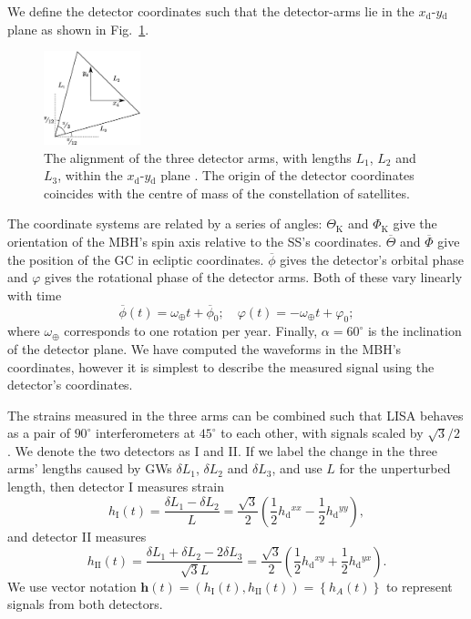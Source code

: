 \documentclass[useAMS,usedcolumn,usegraphicx,usenatbib]{mn2e}
\newcommand{\figref}[1]{Fig.~\ref{fig:#1}}
\newcommand{\sub}[1]{\ensuremath{_\mathrm{#1}}}
\newcommand{\recip}[1]{\ensuremath{\frac{1}{#1}}}
\begin{document}
We define the detector coordinates such that the detector-arms lie in the $x\sub{d}$-$y\sub{d}$ plane as shown in \figref{LISA_arms}.
\begin{figure}
\begin{center}
 \includegraphics[width=0.25\textwidth]{LISA_arms.eps}
    \caption{The alignment of the three detector arms, with lengths $L_1$, $L_2$ and $L_3$, within the $x\sub{d}$-$y\sub{d}$ plane \citep{Cutler1998}. The origin of the detector coordinates coincides with the centre of mass of the constellation of satellites.}
   \label{fig:LISA_arms}
\end{center}
\end{figure}
The coordinate systems are related by a series of angles: $\Theta\sub{K}$ and $\Phi\sub{K}$ give the orientation of the MBH's spin axis relative to the SS's coordinates. $\overline{\Theta}$ and $\overline{\Phi}$ give the position of the GC in ecliptic coordinates. $\overline{\phi}$ gives the detector's orbital phase and $\varphi$ gives the rotational phase of the detector arms. Both of these vary linearly with time
\begin{equation}
\overline{\phi}(t) = \omega_\oplus t + \overline{\phi}_0; \quad \varphi(t) = -\omega_\oplus t + \varphi_0;
\end{equation}
where $\omega_\oplus$ corresponds to one rotation per year. Finally, $\alpha = 60^{\circ}$ is the inclination of the detector plane. We have computed the waveforms in the MBH's coordinates, however it is simplest to describe the measured signal using the detector's coordinates.

The strains measured in the three arms can be combined such that LISA behaves as a pair of $90^{\circ}$ interferometers at $45^{\circ}$ to each other, with signals scaled by ${\sqrt{3}}/{2}$ \citep{Cutler1998}. We denote the two detectors as I and II. If we label the change in the three arms' lengths caused by GWs $\delta L_1$, $\delta L_2$ and $\delta L_3$, and use $L$ for the unperturbed length, then detector I measures strain
\begin{equation}
h\sub{I}(t) = \frac{\delta L_1 - \delta L_2}{L} = \frac{\sqrt{3}}{2}\left(\recip{2} h\sub{d}^{xx} - \recip{2}h\sub{d}^{yy}\right),
\end{equation}
and detector II measures
\begin{equation}
h\sub{II}(t) = \frac{\delta L_1 + \delta L_2 - 2 \delta L_3}{\sqrt{3}L} = \frac{\sqrt{3}}{2}\left(\recip{2} h\sub{d}^{xy} + \recip{2} h\sub{d}^{yx}\right).
\end{equation}
We use vector notation $\boldsymbol{h}(t) = \left(h\sub{I}(t), h\sub{II}(t)\right) = \left\{h_A(t)\right\}$ to represent signals from both detectors.
\end{document}
